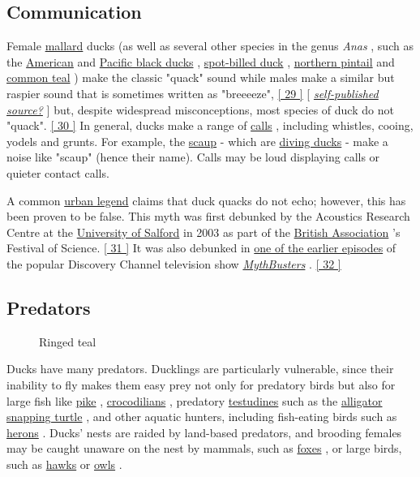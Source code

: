 \documentclass[11pt,a4paper]{article}
\begin{document}
\subsection{Communication}

Female \href{/wiki/Mallard}{mallard} ducks (as well as several other species in the genus \textit{Anas} , such as the \href{/wiki/American\_black\_duck}{American} and \href{/wiki/Pacific\_black\_duck}{Pacific black ducks} , \href{/wiki/Spot-billed\_duck}{spot-billed duck} , \href{/wiki/Northern\_pintail}{northern pintail} and \href{/wiki/Common\_teal}{common teal} ) make the classic "quack" sound while males make a similar but raspier sound that is sometimes written as "breeeeze", \href{\#cite\_note-29}{[ 29 ]} [ \href{/wiki/Wikipedia:Verifiability\#Self-published\_sources}{\textit{self-published source?}} ] but, despite widespread misconceptions, most species of duck do not "quack". \href{\#cite\_note-30}{[ 30 ]} In general, ducks make a range of \href{/wiki/Bird\_vocalisation}{calls} , including whistles, cooing, yodels and grunts. For example, the \href{/wiki/Scaup}{scaup} - which are \href{/wiki/Diving\_duck}{diving ducks} - make a noise like "scaup" (hence their name). Calls may be loud displaying calls or quieter contact calls.

A common \href{/wiki/Urban\_legend}{urban legend} claims that duck quacks do not echo; however, this has been proven to be false. This myth was first debunked by the Acoustics Research Centre at the \href{/wiki/University\_of\_Salford}{University of Salford} in 2003 as part of the \href{/wiki/British\_Association}{British Association} 's Festival of Science. \href{\#cite\_note-31}{[ 31 ]} It was also debunked in \href{/wiki/MythBusters\_\%282003\_season\%29\#Does\_a\_Duck's\_Quack\_Echo?}{one of the earlier episodes} of the popular Discovery Channel television show \href{/wiki/MythBusters}{\textit{MythBusters}} . \href{\#cite\_note-32}{[ 32 ]}

\subsection{Predators}

\begin{figure}[h]
\caption{Ringed teal}
\end{figure}

Ducks have many predators. Ducklings are particularly vulnerable, since their inability to fly makes them easy prey not only for predatory birds but also for large fish like \href{/wiki/Esox}{pike} , \href{/wiki/Crocodilia}{crocodilians} , predatory \href{/wiki/Testudines}{testudines} such as the \href{/wiki/Alligator\_snapping\_turtle}{alligator snapping turtle} , and other aquatic hunters, including fish-eating birds such as \href{/wiki/Heron}{herons} . Ducks' nests are raided by land-based predators, and brooding females may be caught unaware on the nest by mammals, such as \href{/wiki/Fox}{foxes} , or large birds, such as \href{/wiki/Hawk}{hawks} or \href{/wiki/Owl}{owls} .
\end{document}
